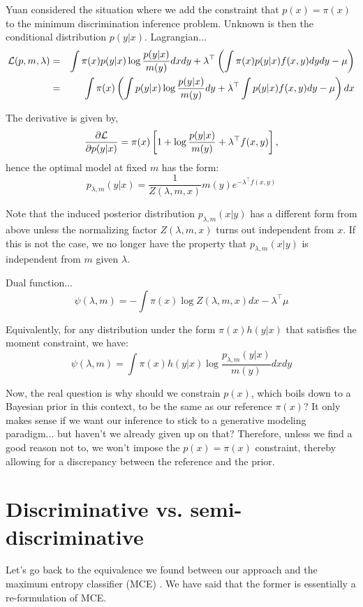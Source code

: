 \documentclass[english]{scrartcl}
\begin{document}
Yuan \cite{Yuan-99} considered the situation where we add the
constraint that $p(x)=\pi(x)$ to the minimum discrimination inference
problem. Unknown is then the conditional distribution
$p(y|x)$. Lagrangian...
\begin{eqnarray*}
{\cal L}(p,m,\lambda)
 & = & 
\int \pi(x)p(y|x) \log \frac{p(y|x)}{m(y)} dxdy
+
\lambda^\top \left( 
\int \pi(x)p(y|x) f(x,y) dydy - \mu 
\right) \\
 & = & 
\int \pi(x)
\left( 
\int
p(y|x) \log \frac{p(y|x)}{m(y)} dy
+
\lambda^\top 
\int p(y|x) f(x,y) dy
- \mu 
\right)
dx 
\end{eqnarray*}

The derivative is given by,
$$
\frac{\partial\cal L}{\partial p(y|x)}
= 
\pi(x)\left[ 
1 + \log \frac{p(y|x)}{m(y)} 
+ \lambda^\top f(x,y)
\right],
$$
hence the optimal model at fixed $m$ has the form:
$$
p_{\lambda,m}(y|x) = \frac{1}{Z(\lambda,m,x)} m(y) e^{-\lambda^\top f(x,y)} 
$$

Note that the induced posterior distribution $p_{\lambda,m}(x|y)$ has
a different form from above unless the normalizing factor
$Z(\lambda,m,x)$ turns out independent from $x$. If this is not the
case, we no longer have the property that $p_{\lambda,m}(x|y)$ is
independent from $m$ given $\lambda$.

Dual function...
$$
\psi(\lambda,m) 
=
- \int \pi(x) \log Z(\lambda, m, x) dx
- \lambda^\top \mu
$$

Equivalently, for any distribution under the form $\pi(x)h(y|x)$ that
satisfies the moment constraint, we have:
$$
\psi(\lambda,m) 
=
\int \pi(x) h(y|x) \log \frac{p_{\lambda,m}(y|x)}{m(y)} dxdy
$$

Now, the real question is why should we constrain $p(x)$, which boils
down to a Bayesian prior in this context, to be the same as our
reference $\pi(x)$? It only makes sense if we want our inference to
stick to a generative modeling paradigm... but haven't we already
given up on that? Therefore, unless we find a good reason not to, we
won't impose the $p(x)=\pi(x)$ constraint, thereby allowing for a
discrepancy between the reference and the prior.


\section{Discriminative vs. semi-discriminative}

Let's go back to the equivalence we found between our approach and the
maximum entropy classifier (MCE) \cite{BergerA-96}. We have said that
the former is essentially a re-formulation of MCE.
\end{document}
